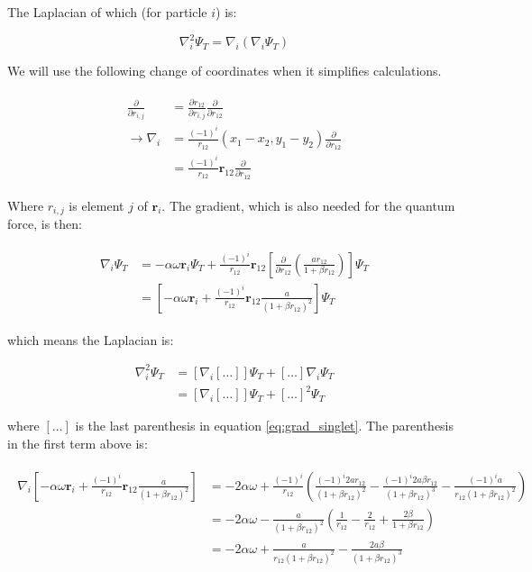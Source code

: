 \documentclass[english, a4paper]{article}
\newcommand{\bm}[1]{\mathbf{#1}}
\begin{document}
The Laplacian of which (for particle $i$) is:

\begin{equation}
	\nabla_i^2 \Psi_T = \nabla_i(\nabla_i\Psi_T)
\end{equation}

We will use the following change of coordinates when it simplifies calculations.

\begin{align}
	\begin{split}
	\frac{\partial}{\partial r_{i,j}} &= \frac{\partial r_{12}}{\partial r_{i,j}}\frac{\partial}{\partial r_{12}}\\
	\rightarrow \nabla_i &= \frac{(-1)^i}{r_{12}}(x_1-x_2, y_1-y_2)\frac{\partial}{\partial r_{12}}\\
	&= \frac{(-1)^i}{r_{12}}\bm{r}_{12}\frac{\partial}{\partial r_{12}}
	\end{split}
	\label{eq:coord_change_nabla}
\end{align}

Where $r_{i,j}$ is element $j$ of $\bm{r}_i$.
The gradient, which is also needed for the quantum force, is then:

\begin{align}
	\begin{split}
	\nabla_i\Psi_T &= -\alpha\omega\bm{r}_i\Psi_T + \frac{(-1)^i}{r_{12}}\bm{r}_{12}\left[\frac{\partial}{\partial r_{12}}\left(\frac{ar_{12}}{1+\beta r_{12}}\right)\right]\Psi_T\\
	&= \left[-\alpha\omega\bm{r}_i + \frac{(-1)^i}{r_{12}}\bm{r}_{12}\frac{a}{(1+\beta r_{12})^2}\right]\Psi_T
	\end{split}
	\label{eq:grad_singlet}
\end{align} 

which means the Laplacian is:

\begin{equation}
	\begin{split}
	\nabla_i^2\Psi_T &= \left[\nabla_i[\ldots]\right]\Psi_T + [\ldots]\nabla_i\Psi_T\\
	&= \left[\nabla_i[\ldots]\right]\Psi_T + [\ldots]^2\Psi_T
	\end{split}
\end{equation}

where $[\ldots]$ is the last parenthesis in equation \ref{eq:grad_singlet}. The parenthesis in the first term above is:

\begin{align}
	\begin{split}
	\nabla_i\left[-\alpha\omega\bm{r}_i + \frac{(-1)^i}{r_{12}}\bm{r}_{12}\frac{a}{(1+\beta r_{12})^2}\right] &= -2\alpha\omega + \frac{(-1)^i}{r_{12}}\left( \frac{(-1)^i2ar_{12}}{(1+\beta r_{12})^2} - \frac{(-1)^i2a\beta r_{12}}{(1+\beta r_{12})^3} - \frac{(-1)^ia}{r_{12}(1+\beta r_{12})^2}\right)\\
	&= -2\alpha\omega - \frac{a}{(1+\beta r_{12})^2}\left( \frac{1}{r_{12}} - \frac{2}{r_{12}} + \frac{2\beta}{1+\beta r_{12}}\right)\\
	&= -2\alpha\omega + \frac{a}{r_{12}(1+\beta r_{12})^2}- \frac{2a\beta}{(1+\beta r_{12})^3}
	\end{split}
\end{align}
\end{document}
